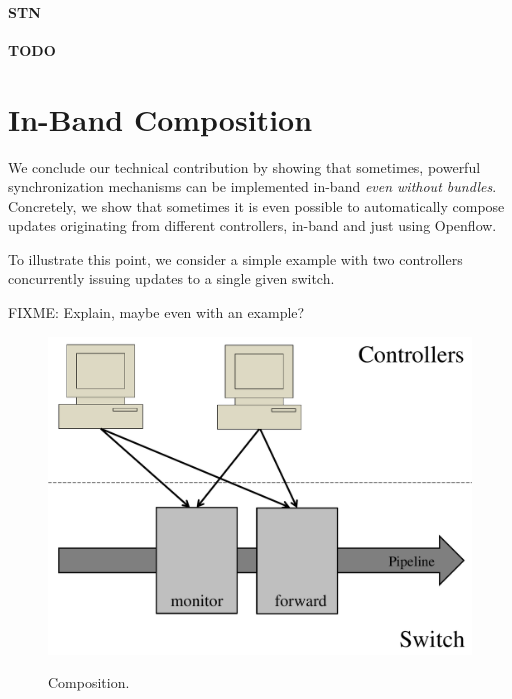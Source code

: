 \documentclass[conference]{sigcomm-alternate}
\begin{document}

\paragraph{STN} 

\textbf{TODO}

\section{In-Band Composition}\label{sec:compo}

We conclude our technical contribution by showing that sometimes,
powerful synchronization mechanisms can be implemented
in-band \emph{even without bundles}.
Concretely, we show that sometimes it is even possible
to automatically compose updates originating from different controllers,
in-band and just using Openflow.

To illustrate this point, we consider a simple example
with two controllers concurrently issuing updates to a single
given switch.

FIXME: Explain, maybe even with an example?

\begin{figure}[t]
\centering
\includegraphics[width=0.8\columnwidth]{composition.pdf}\\
\caption{Composition.}\label{fig:illu}
\end{figure}
\end{document}
